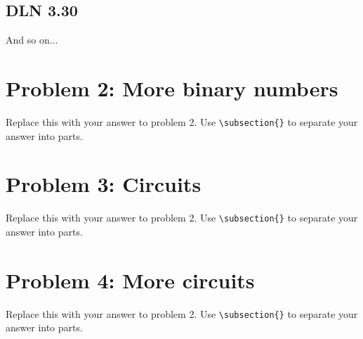 \documentclass[titlepage]{article}
\begin{document}
\subsection{DLN 3.30} 

And so on...


\section{Problem 2: More binary numbers}

Replace this with your answer to problem 2.  Use \verb|\subsection{}| to separate your answer into parts.

\section{Problem 3: Circuits}

Replace this with your answer to problem 2.  Use \verb|\subsection{}| to separate your answer into parts.

\section{Problem 4: More circuits}

Replace this with your answer to problem 2.  Use \verb|\subsection{}| to separate your answer into parts.
\end{document}
